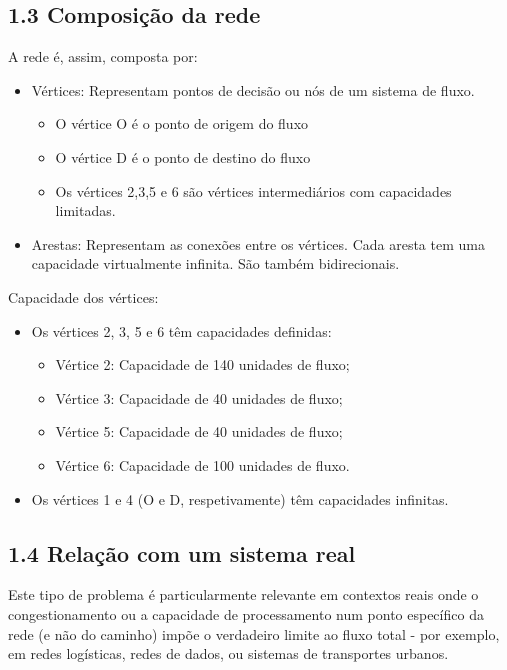 \documentclass[a4paper,12pt]{article}
\begin{document}
\subsection*{1.3 Composição da rede}
A rede é, assim, composta por:
\begin{itemize}
    \item Vértices: Representam pontos de decisão ou nós de um sistema de fluxo.
    \begin{itemize}
        \item O vértice O é o ponto de origem do fluxo
        \item O vértice D é o ponto de destino do fluxo
        \item Os vértices 2,3,5 e 6 são vértices intermediários com capacidades limitadas.
    \end{itemize}
    \item Arestas: Representam as conexões entre os vértices. Cada aresta tem uma capacidade virtualmente infinita. São também bidirecionais.
\end{itemize}

Capacidade dos vértices:
\begin{itemize}
    \item Os vértices 2, 3, 5 e 6 têm capacidades definidas:
        \begin{itemize}
            \item Vértice 2: Capacidade de 140 unidades de fluxo;
            \item Vértice 3: Capacidade de 40 unidades de fluxo;
            \item Vértice 5: Capacidade de 40 unidades de fluxo;
            \item Vértice 6: Capacidade de 100 unidades de fluxo.
        \end{itemize}
    \item Os vértices 1 e 4 (O e D, respetivamente) têm capacidades infinitas.
\end{itemize}

\subsection*{1.4 Relação com um sistema real}
Este tipo de problema é particularmente relevante em contextos reais onde o congestionamento ou a capacidade de processamento num ponto específico da rede (e não do caminho) impõe o verdadeiro limite ao fluxo total - por exemplo, em redes logísticas, redes de dados, ou sistemas de transportes urbanos.
\end{document}
